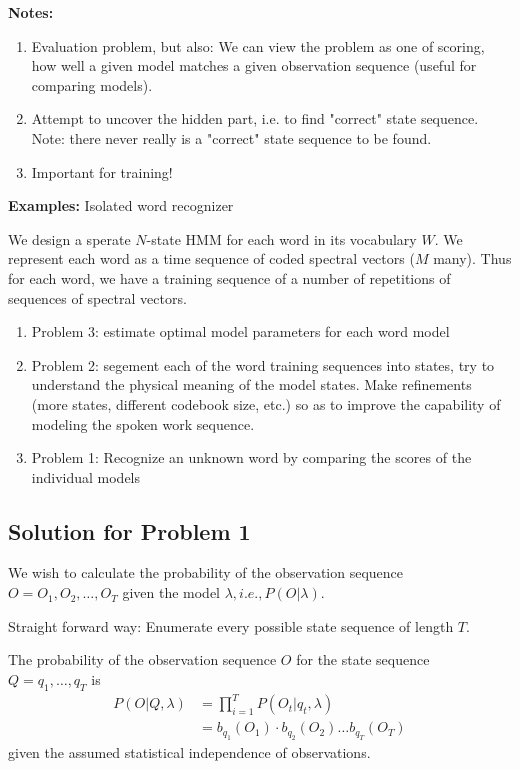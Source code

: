 \documentclass{scrartcl}
\begin{document}
\begin{appendices}
\bigbreak

\textbf{Notes:}
\begin{enumerate}
    \item
        Evaluation problem, but also: We can view the problem as one of scoring, how well a given model matches a given observation sequence (useful for comparing models).
    \item
        Attempt to uncover the hidden part, i.e. to find "correct" state sequence. Note: there never really is a "correct" state sequence to be found.
    \item
        Important for training!
\end{enumerate}

\textbf{Examples:} Isolated word recognizer

We design a sperate \(N\)-state HMM for each word in its vocabulary \(W\).
We represent each word as a time sequence of coded spectral vectors (\(M\) many).
Thus for each word, we have a training sequence of a number of repetitions of sequences of spectral vectors.

\begin{enumerate}
    \item
        Problem 3: estimate optimal model parameters for each word model
    \item
        Problem 2: segement each of the word training sequences into states, try to understand the physical meaning of the model states. Make refinements (more states, different codebook size, etc.) so as to improve the capability of modeling the spoken work sequence.
    \item
        Problem 1: Recognize an unknown word by comparing the scores of the individual models
\end{enumerate}

\subsection{Solution for Problem 1}
We wish to calculate the probability of the observation sequence \(O = O_1, O_2, \dots, O_T\) given the model \(\lambda, i.e., P(O|\lambda)\).

Straight forward way: Enumerate every possible state sequence of length \(T\).

The probability of the observation sequence \(O\) for the state sequence \(Q = q_1, \dots, q_T\) is
\begin{align*}
    P(O|Q, \lambda) &= \prod_{i=1}^T P(O_t | q_t, \lambda)\\
    &= b_{q_1}(O_1) \cdot b_{q_2}(O_2) \dots  b_{q_T}(O_T)
\end{align*}
given the assumed statistical independence of observations.


\end{appendices}
\end{document}
